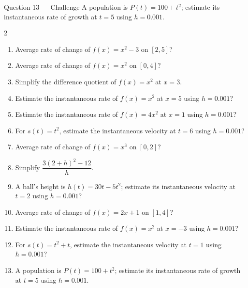 \documentclass[11pt]{article}
\begin{document}
\begin{qbox}{Question 13 --- Challenge}
A population is $P(t)=100+t^2$; estimate its instantaneous rate of growth at $t=5$ using $h=0.001$.\workspace{3cm}
\end{qbox}

\clearpage
{}

\begin{recapbox}
\begin{multicols}{2}
\small
\begin{enumerate}[leftmargin=*,itemsep=3pt]
  \item Average rate of change of $f(x)=x^2-3$ on $[2,5]$?
  \item Average rate of change of $f(x)=x^2$ on $[0,4]$?
  \item Simplify the difference quotient of $f(x)=x^2$ at $x=3$.
  \item Estimate the instantaneous rate of $f(x)=x^2$ at $x=5$ using $h=0.001$?
  \item Estimate the instantaneous rate of $f(x)=4x^2$ at $x=1$ using $h=0.001$?
  \item For $s(t)=t^2$, estimate the instantaneous velocity at $t=6$ using $h=0.001$?
  \item Average rate of change of $f(x)=x^3$ on $[0,2]$?
  \item Simplify $\dfrac{3(2+h)^2-12}{h}$.
  \item A ball's height is $h(t)=30t-5t^2$; estimate its instantaneous velocity at $t=2$ using $h=0.001$?
  \item Average rate of change of $f(x)=2x+1$ on $[1,4]$?
  \item Estimate the instantaneous rate of $f(x)=x^2$ at $x=-3$ using $h=0.001$?
  \item For $s(t)=t^2+t$, estimate the instantaneous velocity at $t=1$ using $h=0.001$?
  \item A population is $P(t)=100+t^2$; estimate its instantaneous rate of growth at $t=5$ using $h=0.001$.
\end{enumerate}
\end{multicols}
\end{recapbox}
\end{document}
